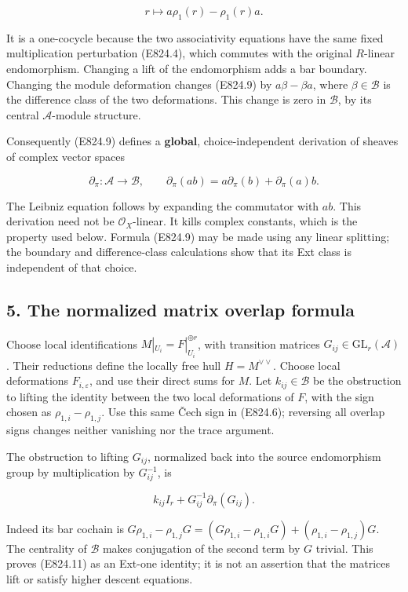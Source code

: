 \[
 r\longmapsto a\rho_1(r)-\rho_1(r)a.
 \tag{E824.9}
\]

It is a one-cocycle because the two associativity equations have the
same fixed multiplication perturbation (E824.4), which commutes with the
original \(R\)-linear endomorphism. Changing a lift of the endomorphism
adds a bar boundary. Changing the module deformation changes (E824.9) by
\(a\beta-\beta a\), where \(\beta\in\mathcal B\) is the difference class
of the two deformations. This change is zero in \(\mathcal B\), by its
central \(\mathcal A\)-module structure.

Consequently (E824.9) defines a \textbf{global}, choice-independent
derivation of sheaves of complex vector spaces

\[
 \partial_\pi:\mathcal A\longrightarrow\mathcal B,
 \qquad
 \partial_\pi(ab)=a\partial_\pi(b)+\partial_\pi(a)b.
 \tag{E824.10}
\]

The Leibniz equation follows by expanding the commutator with \(ab\).
This derivation need not be \(\mathcal O_X\)-linear. It kills complex
constants, which is the property used below. Formula (E824.9) may be
made using any linear splitting; the boundary and difference-class
calculations show that its Ext class is independent of that choice.

\subsection{5. The normalized matrix overlap
formula}\label{SF-E824-the-normalized-matrix-overlap-formula}

Choose local identifications \(M|_{U_i}=F|_{U_i}^{\oplus r}\), with
transition matrices \(G_{ij}\in\mathrm{GL}_r(\mathcal A)\). Their
reductions define the locally free hull \(H=M^{\vee\vee}\). Choose local
deformations \(F_{i,\varepsilon}\), and use their direct sums for \(M\).
Let \(k_{ij}\in\mathcal B\) be the obstruction to lifting the identity
between the two local deformations of \(F\), with the sign chosen as
\(\rho_{1,i}-\rho_{1,j}\). Use this same Čech sign in (E824.6);
reversing all overlap signs changes neither vanishing nor the trace
argument.

The obstruction to lifting \(G_{ij}\), normalized back into the source
endomorphism group by multiplication by \(G_{ij}^{-1}\), is

\[
 k_{ij} I_r+G_{ij}^{-1}\partial_\pi(G_{ij}).
 \tag{E824.11}
\]

Indeed its bar cochain is \(G\rho_{1,i}-\rho_{1,j}G
=(G\rho_{1,i}-\rho_{1,i}G)+(\rho_{1,i}-\rho_{1,j})G\). The centrality of
\(\mathcal B\) makes conjugation of the second term by \(G\) trivial.
This proves (E824.11) as an Ext-one identity; it is not an assertion
that the matrices lift or satisfy higher descent equations.

